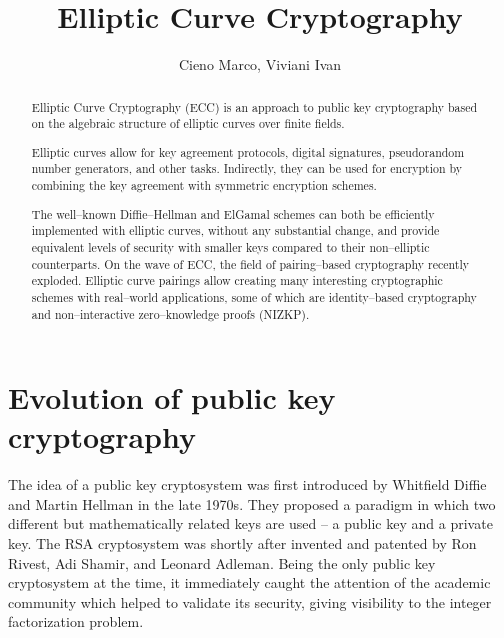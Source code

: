 \documentclass[9pt]{article}
\title{Elliptic Curve Cryptography}
\author{Cieno Marco, Viviani Ivan}
\date{}
\theoremstyle{definition}
\begin{document}
\maketitle
\thispagestyle{empty}
\begin{abstract}
Elliptic Curve Cryptography (ECC) is an approach to public key cryptography based on the algebraic structure of elliptic curves over finite fields.

Elliptic curves allow for key agreement protocols, digital signatures, pseudorandom number generators, and other tasks. Indirectly, they can be used for encryption by combining the key agreement with symmetric encryption schemes.

The well--known Diffie--Hellman and ElGamal schemes can both be efficiently implemented with elliptic curves, without any substantial change, and provide equivalent levels of security with smaller keys compared to their non--elliptic counterparts. On the wave of ECC, the field of pairing--based cryptography recently exploded. Elliptic curve pairings allow creating many interesting cryptographic schemes with real--world applications, some of which are identity--based cryptography and non--interactive zero--knowledge proofs (NIZKP).
\end{abstract}

\clearpage %
\tableofcontents %
\setcounter{page}{1} %
\renewcommand{\thepage}{\textsc{\roman{page}}} %
\clearpage %
\setcounter{page}{1} %
\renewcommand{\thepage}{\arabic{page}} %


\section{Evolution of public key cryptography}
The idea of a public key cryptosystem was first introduced by Whitfield Diffie and Martin Hellman in the late 1970s. They proposed a paradigm in which two different but mathematically related keys are used -- a public key and a private key.
The RSA cryptosystem was shortly after invented and patented by Ron Rivest, Adi Shamir, and Leonard Adleman. 
Being the only public key cryptosystem at the time, it immediately caught the attention of the academic community which helped to validate its security, giving visibility to the integer factorization problem.
\end{document}
